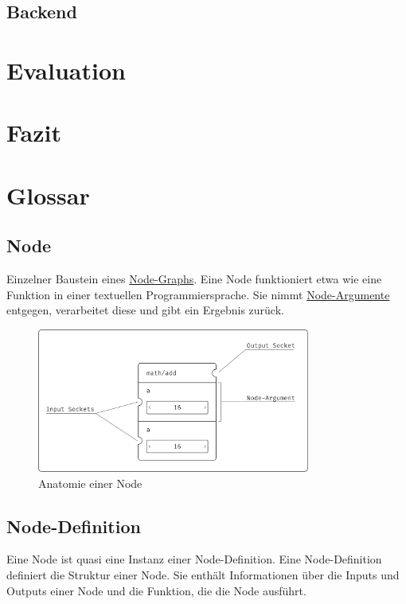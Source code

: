 \documentclass[ngerman]{article}
\begin{document}
\subsection{Backend}

\section{Evaluation}

\section{Fazit}

\pagebreak
\section{Glossar}

\subsection{Node}
\label{sec:node}
Einzelner Baustein eines \hyperref[sec:node_graph]{Node-Graphs}. Eine Node funktioniert etwa wie eine Funktion in einer textuellen Programmiersprache. Sie nimmt \hyperref[sec:node_argumente]{Node-Argumente} entgegen, verarbeitet diese und gibt ein Ergebnis zurück. 

\begin{figure}[htbp]
    \centering
    \includegraphics[width=0.8\textwidth]{graphics/NODE_ANATOMY.pdf}
    \caption{Anatomie einer Node}
    \label{sec:NODE_ANATOMY}
\end{figure}

\subsection{Node-Definition}
\label{sec:node_definition}
Eine Node ist quasi eine Instanz einer Node-Definition. Eine Node-Definition definiert die Struktur einer Node. Sie enthält Informationen über die Inputs und Outputs einer Node und die Funktion, die die Node ausführt.
\end{document}
